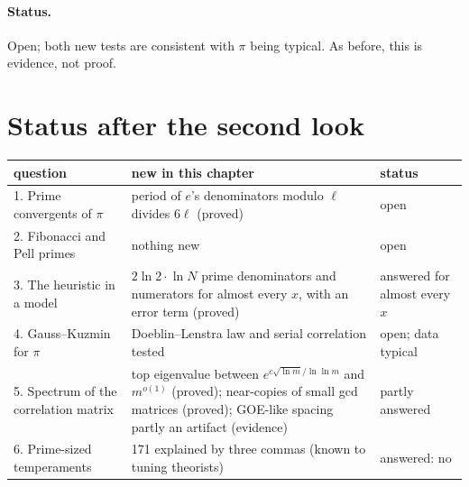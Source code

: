 \paragraph{Status.} Open; both new tests are consistent with $\pi$ being typical. As before, this is evidence, not proof.

\section{Status after the second look}\label{sec:ob-status}

\noindent\begin{minipage}{\textwidth}
\centering
{}
\label{tab:ob-status}
\small
\begin{tabularx}{\textwidth}{lXl}
\toprule
question & new in this chapter & status \\
\midrule
1. Prime convergents of $\pi$ & period of $e$'s denominators modulo $\ell$ divides $6\ell$ (proved) & open \\
2. Fibonacci and Pell primes & nothing new & open \\
3. The heuristic in a model & $2\ln 2\cdot\ln N$ prime denominators and numerators for almost every $x$, with an error term (proved) & answered for almost every $x$ \\
4. Gauss--Kuzmin for $\pi$ & Doeblin--Lenstra law and serial correlation tested & open; data typical \\
5. Spectrum of the correlation matrix & top eigenvalue between $e^{c\sqrt{\ln m}/\ln\ln m}$ and $m^{o(1)}$ (proved); near-copies of small gcd matrices (proved); GOE-like spacing partly an artifact (evidence) & partly answered \\
6. Prime-sized temperaments & 171 explained by three commas (known to tuning theorists) & answered: no \\
\bottomrule
\end{tabularx}
\end{minipage}
\medskip
